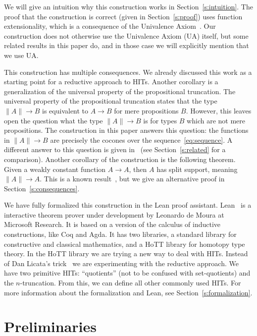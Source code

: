 \documentclass[square]{sigplanconf}
\theoremstyle{definition}
\theoremstyle{remark}
\begin{document}
We will give an intuition why this construction works in Section~\ref{s:intuition}. The proof that
the construction is correct (given in Section~\ref{s:proof}) uses function extensionality, which is
a consequence of the Univalence Axiom~\cite[Section 4.9]{HoTTbook}. Our construction does not
otherwise use the Univalence Axiom (UA) itself, but some related results in this paper do, and in
those case we will explicitly mention that we use UA.

This construction has multiple consequences. We already discussed this work as a starting point for
a reductive approach to HITs. Another corollary is a generalization of the universal property of the
propositional truncation. The universal property of the propositional truncation states that the
type $\|A\|\to B$ is equivalent to $A\to B$ for mere propositions $B$. However, this leaves open the
question what the type $\|A\|\to B$ is for types $B$ which are not mere propositions. The
construction in this paper answers this question: the functions in $\|A\|\to B$ are precisely the
cocones over the sequence~\eqref{eq:sequence}. A different answer to this question is given
in~\cite{Kraus2014UniversalProperty} (see Section~\ref{s:related} for a comparison). Another
corollary of the construction is the following theorem. Given a weakly constant function $A\to A$,
then $A$ has split support, meaning $\|A\|\to A$. This is a known result~\cite[Theorem
  4.5]{Kraus2014anonymousexistence}, but we give an alternative proof in
Section~\ref{s:consequences}.

We have fully formalized this construction in the Lean proof assistant. Lean~\cite{Moura2015Lean} is
a interactive theorem prover under development by Leonardo de Moura at Microsoft Research. It is
based on a version of the calculus of inductive constructions, like Coq and Agda. It has two
libraries, a standard library for constructive and classical mathematics, and a HoTT library for
homotopy type theory. In the HoTT library we are trying a new way to deal with HITs. Instead of Dan
Licata's trick~\cite{Licata2011trick} we are experimenting with the reductive approach. We have two
primitive HITs: ``quotients'' (not to be confused with set-quotients) and the $n$-truncation. From
this, we can define all other commonly used HITs. For more information about the formalization and
Lean, see Section~\ref{s:formalization}.

\section{Preliminaries}\label{s:prelim}
\end{document}
